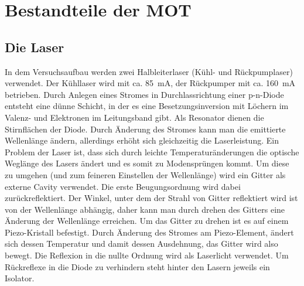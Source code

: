\documentclass[12pt, a4paper]{article}
\begin{document}
\section{Bestandteile der MOT}
  \subsection{Die Laser}
    In dem Versuchsaufbau werden zwei Halbleiterlaser (Kühl- und Rückpumplaser)
    verwendet. Der Kühllaser wird mit ca. \SI{85}{\mA}, der Rückpumper mit ca.
    \SI{160}{\mA} betrieben. Durch Anlegen eines Stromes in Durchlassrichtung
    einer p-n-Diode entsteht eine dünne Schicht, in der es eine Besetzungsinversion
    mit Löchern im Valenz- und Elektronen im Leitungsband gibt. Als Resonator
    dienen die Stirnflächen der Diode. Durch Änderung des Stromes kann man die
    emittierte Wellenlänge ändern, allerdings erhöht sich gleichzeitig die
    Laserleistung. Ein Problem der Laser ist, dass sich durch leichte
    Temperaturänderungen die optische Weglänge des Lasers ändert und es somit zu
    Modensprüngen kommt. Um diese zu umgehen (und zum feineren Einstellen der
    Wellenlänge) wird ein Gitter als externe Cavity verwendet. Die erste
    Beugungsordnung wird dabei zurückreflektiert. Der Winkel, unter dem der Strahl
    von Gitter reflektiert wird ist von der Wellenlänge abhängig, daher kann man
    durch drehen des Gitters eine Änderung der Wellenlänge erreichen. Um das Gitter
    zu drehen ist es auf einem Piezo-Kristall befestigt. Durch Änderung des Stromes
    am Piezo-Element, ändert sich dessen Temperatur und damit dessen Ausdehnung, das
    Gitter wird also bewegt. Die Reflexion in die nullte Ordnung wird als Laserlicht
    verwendet. Um Rückreflexe in die Diode zu verhindern steht hinter den Lasern
    jeweils ein Isolator.
\end{document}
